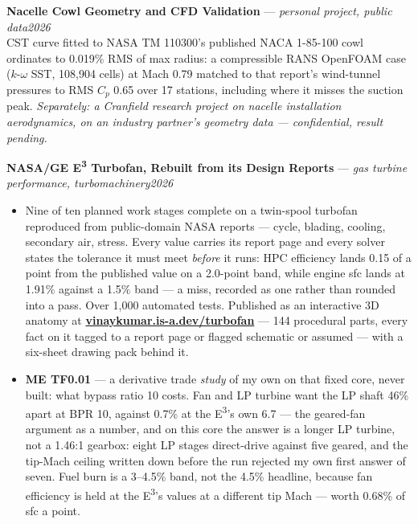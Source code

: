 \documentclass[10pt,a4paper]{article}
\newcommand{\project}[3]{%
  \vspace{0.12em}\textbf{#1} --- \textit{#2}\hfill \textit{#3}\\[0.1em]}
\begin{document}
\project{Nacelle Cowl Geometry and CFD Validation}{personal project, public data}{2026}
CST curve fitted to NASA TM 110300's published NACA 1-85-100 cowl ordinates to 0.019\% RMS of max radius: a compressible RANS OpenFOAM case ($k$-$\omega$ SST, 108{,}904 cells) at Mach 0.79 matched to that report's wind-tunnel pressures to RMS $C_p$ 0.65 over 17 stations, including where it misses the suction peak. \textit{Separately: a Cranfield research project on nacelle installation aerodynamics, on an industry partner's geometry data --- confidential, result pending.}

\project{NASA/GE E\textsuperscript{3} Turbofan, Rebuilt from its Design Reports}{gas turbine performance, turbomachinery}{2026}
\begin{itemize}
\item Nine of ten planned work stages complete on a twin-spool turbofan reproduced from public-domain NASA reports --- cycle, blading, cooling, secondary air, stress. Every value carries its report page and every solver states the tolerance it must meet \textit{before} it runs: HPC efficiency lands 0.15 of a point from the published value on a 2.0-point band, while engine sfc lands at 1.91\% against a 1.5\% band --- a miss, recorded as one rather than rounded into a pass. Over 1{,}000 automated tests. Published as an interactive 3D anatomy at \href{https://vinaykumar.is-a.dev/turbofan}{\textbf{vinaykumar.is-a.dev/turbofan}} --- 144 procedural parts, every fact on it tagged to a report page or flagged schematic or assumed --- with a six-sheet drawing pack behind it.
\item \textbf{ME TF0.01} --- a derivative trade \textit{study} of my own on that fixed core, never built: what bypass ratio 10 costs. Fan and LP turbine want the LP shaft 46\% apart at BPR 10, against 0.7\% at the E\textsuperscript{3}'s own 6.7 --- the geared-fan argument as a number, and on this core the answer is a longer LP turbine, not a 1.46:1 gearbox: eight LP stages direct-drive against five geared, and the tip-Mach ceiling written down before the run rejected my own first answer of seven. Fuel burn is a 3--4.5\% band, not the 4.5\% headline, because fan efficiency is held at the E\textsuperscript{3}'s values at a different tip Mach --- worth 0.68\% of sfc a point.
\end{itemize}


\end{document}
